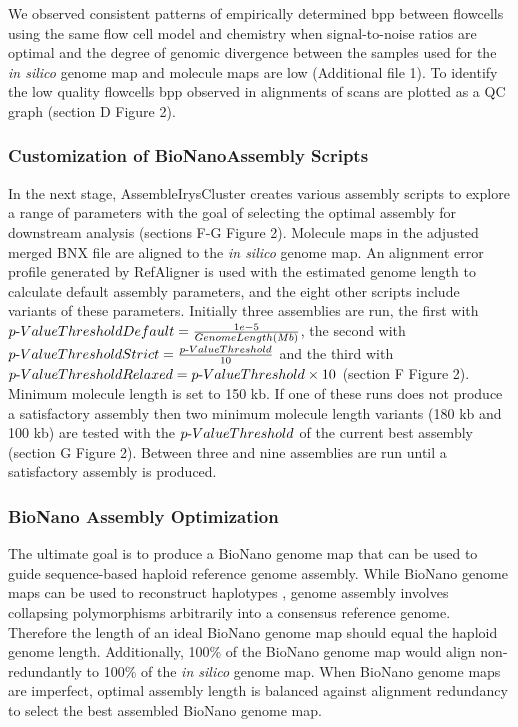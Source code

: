 \documentclass{bmcart}
\begin{document}
We observed consistent patterns of empirically determined bpp between flowcells using the same flow cell model and chemistry when signal-to-noise ratios are optimal and the degree of genomic divergence between the samples used for the \textit{in silico} genome map and molecule maps are low (Additional file 1). To identify the low quality flowcells bpp observed in alignments of scans are plotted as a QC graph (section D Figure 2). 

\subsubsection*{Customization of BioNanoAssembly Scripts}

In the next stage, AssembleIrysCluster creates various assembly scripts to explore a range of parameters with the goal of selecting the optimal assembly for downstream analysis (sections F-G Figure 2). Molecule maps in the adjusted merged BNX file are aligned to the \textit{in silico} genome map. An alignment error profile generated by RefAligner is used with the estimated genome length to calculate default assembly parameters, and the eight other scripts include variants of these parameters. Initially three assemblies are run, the first with $p\textnormal{-}Value Threshold Default = \frac{1e-5}{Genome Length (Mb)}$, the second with  $p\textnormal{-}Value Threshold Strict = \frac{p\textnormal{-}Value Threshold}{10}$ and the third with $p\textnormal{-}Value Threshold Relaxed = {p\textnormal{-}Value Threshold} \times {10}$ (section F Figure 2). Minimum molecule length is set to 150 kb. If one of these runs does not produce a satisfactory assembly then two minimum molecule length variants (180 kb and 100 kb) are tested with the $p\textnormal{-}Value Threshold$ of the current best assembly (section G Figure 2). Between three and nine assemblies are run until a satisfactory assembly is produced.

\subsubsection*{BioNano Assembly Optimization}

The ultimate goal is to produce a BioNano genome map that can be used to guide sequence-based haploid reference genome assembly. While BioNano genome maps can be used to reconstruct haplotypes \cite{MHCLam}, genome assembly involves collapsing polymorphisms arbitrarily into a consensus reference genome. Therefore the length of an ideal BioNano genome map should equal the haploid genome length. Additionally, 100\% of the BioNano genome map would align non-redundantly to 100\% of the \textit{in silico} genome map. When BioNano genome maps are imperfect, optimal assembly length is balanced against alignment redundancy to select the best assembled BioNano genome map.
\end{document}
